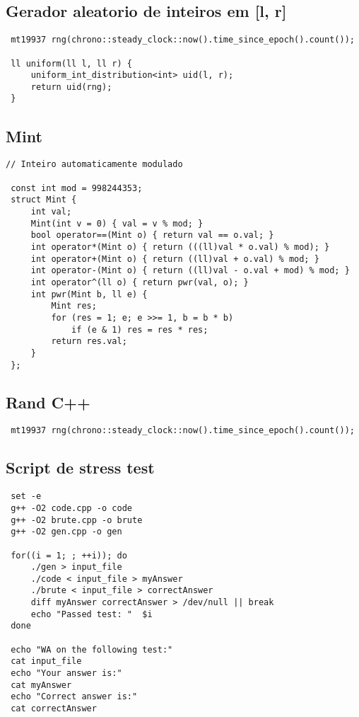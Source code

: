 \documentclass[11pt, a4paper, twoside]{article}
\begin{document}
\subsection{Gerador aleatorio de inteiros em [l, r]}
\begin{lstlisting}
 mt19937 rng(chrono::steady_clock::now().time_since_epoch().count());
 
 ll uniform(ll l, ll r) {
     uniform_int_distribution<int> uid(l, r);
     return uid(rng);
 }
\end{lstlisting}

\subsection{Mint}
\begin{lstlisting}
// Inteiro automaticamente modulado

 const int mod = 998244353;
 struct Mint {
     int val;
     Mint(int v = 0) { val = v % mod; }
     bool operator==(Mint o) { return val == o.val; }
     int operator*(Mint o) { return (((ll)val * o.val) % mod); }
     int operator+(Mint o) { return ((ll)val + o.val) % mod; }
     int operator-(Mint o) { return ((ll)val - o.val + mod) % mod; }
     int operator^(ll o) { return pwr(val, o); }
     int pwr(Mint b, ll e) {
         Mint res;
         for (res = 1; e; e >>= 1, b = b * b)
             if (e & 1) res = res * res;
         return res.val;
     }
 };
\end{lstlisting}

\subsection{Rand C++}
\begin{lstlisting}
 mt19937 rng(chrono::steady_clock::now().time_since_epoch().count());
\end{lstlisting}

\subsection{Script de stress test}
\begin{lstlisting}
 set -e
 g++ -O2 code.cpp -o code
 g++ -O2 brute.cpp -o brute
 g++ -O2 gen.cpp -o gen
 
 for((i = 1; ; ++i)); do
     ./gen > input_file
     ./code < input_file > myAnswer
     ./brute < input_file > correctAnswer
     diff myAnswer correctAnswer > /dev/null || break
     echo "Passed test: "  $i
 done
 
 echo "WA on the following test:"
 cat input_file
 echo "Your answer is:"
 cat myAnswer
 echo "Correct answer is:"
 cat correctAnswer
\end{lstlisting}
\end{document}
